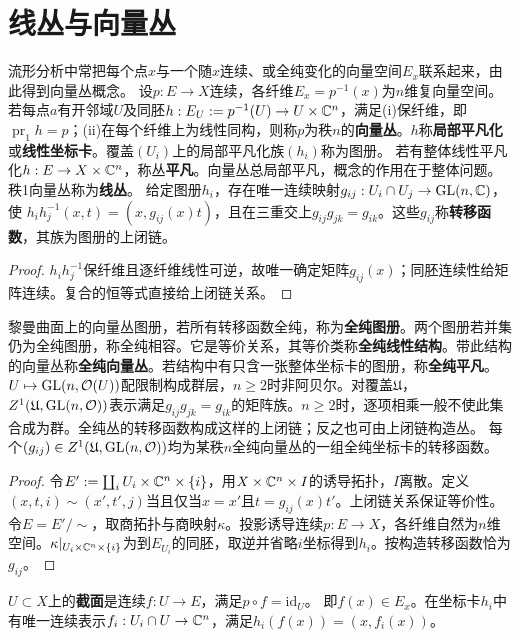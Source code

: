 \section{线丛与向量丛}
流形分析中常把每个点$x$与一个随$x$连续、或全纯变化的向量空间$E_x$联系起来，由此得到向量丛概念。
设$p:E\to X$连续，各纤维$E_x=p^{-1}(x)$为$n$维复向量空间。若每点$a$有开邻域$U$及同胚$h:E_U:=p^{-1}(U)\to U\times\mathbb C^n$，满足(i)保纤维，即$\operatorname{pr}_1h=p$；(ii)在每个纤维上为线性同构，则称$p$为秩$n$的\textbf{向量丛}。$h$称\textbf{局部平凡化}或\textbf{线性坐标卡}。覆盖$(U_i)$上的局部平凡化族$(h_i)$称为图册。
若有整体线性平凡化$h:E\to X\times\mathbb C^n$，称丛\textbf{平凡}。向量丛总局部平凡，概念的作用在于整体问题。
秩1向量丛称为\textbf{线丛}。
给定图册$h_i$，存在唯一连续映射$g_{ij}:U_i\cap U_j\to\operatorname{GL}(n,\mathbb C)$，使
$h_i h_j^{-1}(x,t)=(x,g_{ij}(x)t)$，且在三重交上$g_{ij}g_{jk}=g_{ik}$。这些$g_{ij}$称\textbf{转移函数}，其族为图册的上闭链。
\begin{proof}
$h_ih_j^{-1}$保纤维且逐纤维线性可逆，故唯一确定矩阵$g_{ij}(x)$；同胚连续性给矩阵连续。复合的恒等式直接给上闭链关系。
\end{proof}
黎曼曲面上的向量丛图册，若所有转移函数全纯，称为\textbf{全纯图册}。两个图册若并集仍为全纯图册，称全纯相容。它是等价关系，其等价类称\textbf{全纯线性结构}。带此结构的向量丛称\textbf{全纯向量丛}。若结构中有只含一张整体坐标卡的图册，称\textbf{全纯平凡}。
$U\mapsto\operatorname{GL}(n,\mathcal O(U))$配限制构成群层，$n\ge2$时非阿贝尔。对覆盖$\mathfrak U$，
$Z^1(\mathfrak U,\operatorname{GL}(n,\mathcal O))$表示满足$g_{ij}g_{jk}=g_{ik}$的矩阵族。$n\ge2$时，逐项相乘一般不使此集合成为群。全纯丛的转移函数构成这样的上闭链；反之也可由上闭链构造丛。
每个$(g_{ij})\in Z^1(\mathfrak U,\operatorname{GL}(n,\mathcal O))$均为某秩$n$全纯向量丛的一组全纯坐标卡的转移函数。
\begin{proof}
令$E':=\coprod_iU_i\times\mathbb C^n\times\{i\}$，用$X\times\mathbb C^n\times I$的诱导拓扑，$I$离散。定义$(x,t,i)\sim(x',t',j)$当且仅当$x=x'$且$t=g_{ij}(x)t'$。上闭链关系保证等价性。令$E=E'/\sim$，取商拓扑与商映射$\kappa$。投影诱导连续$p:E\to X$，各纤维自然为$n$维空间。$\kappa|_{U_i\times\mathbb C^n\times\{i\}}$为到$E_{U_i}$的同胚，取逆并省略$i$坐标得到$h_i$。按构造转移函数恰为$g_{ij}$。
\end{proof}
$U\subset X$上的\textbf{截面}是连续$f:U\to E$，满足$p\circ f=\mathrm{id}_U$。
即$f(x)\in E_x$。在坐标卡$h_i$中有唯一连续表示$f_i:U_i\cap U\to\mathbb C^n$，满足$h_i(f(x))=(x,f_i(x))$。
